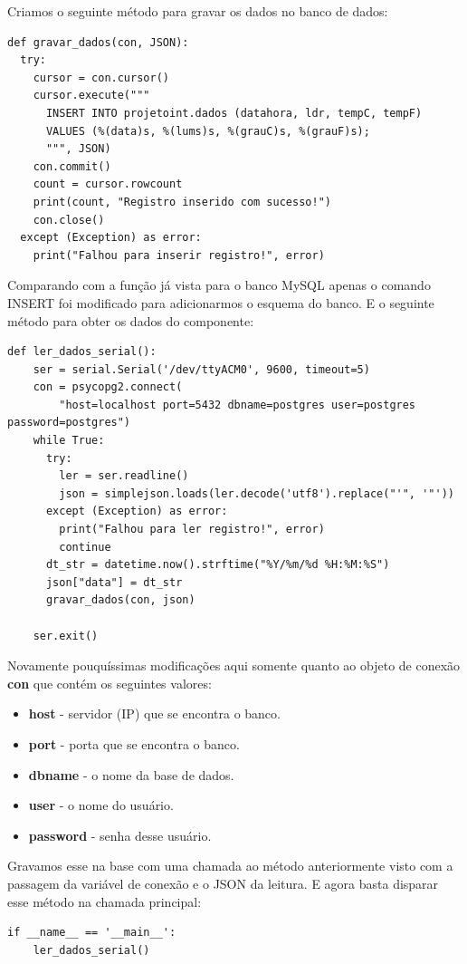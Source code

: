 \documentclass[a4paper,11pt]{article}
\begin{document}
Criamos o seguinte método para gravar os dados no banco de dados:
\begin{lstlisting}[]
def gravar_dados(con, JSON):
  try:
    cursor = con.cursor()
    cursor.execute("""
      INSERT INTO projetoint.dados (datahora, ldr, tempC, tempF)
      VALUES (%(data)s, %(lums)s, %(grauC)s, %(grauF)s);
      """, JSON)
    con.commit()
    count = cursor.rowcount
    print(count, "Registro inserido com sucesso!")
    con.close()
  except (Exception) as error:
    print("Falhou para inserir registro!", error)
\end{lstlisting}

Comparando com a função já vista para o banco MySQL apenas o comando INSERT foi modificado para adicionarmos o esquema do banco. E o seguinte método para obter os dados do componente:
\begin{lstlisting}[]
  def ler_dados_serial():
    ser = serial.Serial('/dev/ttyACM0', 9600, timeout=5)
    con = psycopg2.connect(
        "host=localhost port=5432 dbname=postgres user=postgres password=postgres")    
    while True:
      try:
        ler = ser.readline()
        json = simplejson.loads(ler.decode('utf8').replace("'", '"'))
      except (Exception) as error:
        print("Falhou para ler registro!", error)
        continue
      dt_str = datetime.now().strftime("%Y/%m/%d %H:%M:%S")
      json["data"] = dt_str
      gravar_dados(con, json)

    ser.exit()
\end{lstlisting}

Novamente pouquíssimas modificações aqui somente quanto ao objeto de conexão \textbf{con} que contém os seguintes valores: \vspace{-1em}
\begin{itemize}[nolistsep]
	\item \textbf{host} - servidor (IP) que se encontra o banco.
	\item \textbf{port} - porta que se encontra o banco.
	\item \textbf{dbname} - o nome da base de dados.
	\item \textbf{user} - o nome do usuário.
	\item \textbf{password} - senha desse usuário.
\end{itemize}

Gravamos esse na base com uma chamada ao método anteriormente visto com a passagem da variável de conexão e o JSON da leitura. E agora basta disparar esse método na chamada principal:
\begin{lstlisting}[]
  if __name__ == '__main__':
    ler_dados_serial()
\end{lstlisting}
\end{document}

